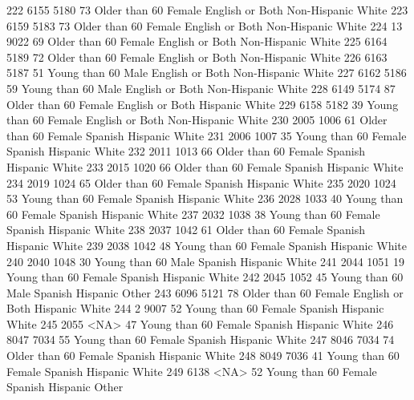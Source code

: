 \documentclass[
  letterpaper,
  DIV=11,
  numbers=noendperiod]{scrreprt}
\newenvironment{Shaded}{\begin{snugshade}}{\end{snugshade}}
\newcommand{\NormalTok}[1]{\textcolor[rgb]{0.00,0.23,0.31}{#1}}
\begin{document}
\begin{Shaded}
\begin{Highlighting}[]
\NormalTok{222 6155 5180  73 Older than 60 Female English or Both Non{-}Hispanic      White}
\NormalTok{223 6159 5183  73 Older than 60 Female English or Both Non{-}Hispanic      White}
\NormalTok{224   13 9022  69 Older than 60 Female English or Both Non{-}Hispanic      White}
\NormalTok{225 6164 5189  72 Older than 60 Female English or Both Non{-}Hispanic      White}
\NormalTok{226 6163 5187  51 Young than 60   Male English or Both Non{-}Hispanic      White}
\NormalTok{227 6162 5186  59 Young than 60   Male English or Both Non{-}Hispanic      White}
\NormalTok{228 6149 5174  87 Older than 60 Female English or Both     Hispanic      White}
\NormalTok{229 6158 5182  39 Young than 60 Female English or Both Non{-}Hispanic      White}
\NormalTok{230 2005 1006  61 Older than 60 Female         Spanish     Hispanic      White}
\NormalTok{231 2006 1007  35 Young than 60 Female         Spanish     Hispanic      White}
\NormalTok{232 2011 1013  66 Older than 60 Female         Spanish     Hispanic      White}
\NormalTok{233 2015 1020  66 Older than 60 Female         Spanish     Hispanic      White}
\NormalTok{234 2019 1024  65 Older than 60 Female         Spanish     Hispanic      White}
\NormalTok{235 2020 1024  53 Young than 60 Female         Spanish     Hispanic      White}
\NormalTok{236 2028 1033  40 Young than 60 Female         Spanish     Hispanic      White}
\NormalTok{237 2032 1038  38 Young than 60 Female         Spanish     Hispanic      White}
\NormalTok{238 2037 1042  61 Older than 60 Female         Spanish     Hispanic      White}
\NormalTok{239 2038 1042  48 Young than 60 Female         Spanish     Hispanic      White}
\NormalTok{240 2040 1048  30 Young than 60   Male         Spanish     Hispanic      White}
\NormalTok{241 2044 1051  19 Young than 60 Female         Spanish     Hispanic      White}
\NormalTok{242 2045 1052  45 Young than 60   Male         Spanish     Hispanic      Other}
\NormalTok{243 6096 5121  78 Older than 60 Female English or Both     Hispanic      White}
\NormalTok{244    2 9007  52 Young than 60 Female         Spanish     Hispanic      White}
\NormalTok{245 2055 \textless{}NA\textgreater{}  47 Young than 60 Female         Spanish     Hispanic      White}
\NormalTok{246 8047 7034  55 Young than 60 Female         Spanish     Hispanic      White}
\NormalTok{247 8046 7034  74 Older than 60 Female         Spanish     Hispanic      White}
\NormalTok{248 8049 7036  41 Young than 60 Female         Spanish     Hispanic      White}
\NormalTok{249 6138 \textless{}NA\textgreater{}  52 Young than 60 Female         Spanish     Hispanic      Other}

\end{Highlighting}
\end{Shaded}
\end{document}
